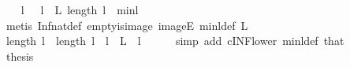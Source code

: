 \begin{isabellebody}
\ \ \isamarkupfalse%
\ l{}\ \ \ {\isachardoublequoteopen}l{}\ {\isasymin}\ L{\isachardoublequoteclose}\ {\isachardoublequoteopen}length\ l{}\ {\isacharequal}{\kern0pt}\ minl{\isachardoublequoteclose}\isanewline
\ \ \ \ \isamarkupfalse%
\ {\isacharparenleft}{\kern0pt}metis\ Inf{\isacharunderscore}{\kern0pt}nat{\isacharunderscore}{\kern0pt}def{}\ empty{\isacharunderscore}{\kern0pt}is{\isacharunderscore}{\kern0pt}image\ imageE\ minl{\isacharunderscore}{\kern0pt}def\ {\isacartoucheopen}L\ {\isasymnoteq}\ {\isacharbraceleft}{\kern0pt}{\isacharbraceright}{\kern0pt}{\isacartoucheclose}{\isacharparenright}{\kern0pt}\isanewline
\ \ \isamarkupfalse%
\ \isamarkupfalse%
\ {\isachardoublequoteopen}length\ l{}\ {\isasymle}\ length\ l{\isachardoublequoteclose}\ \ {\isachardoublequoteopen}l\ {\isasymin}\ L{\isachardoublequoteclose}\ \ l\isanewline
\ \ \ \ \isamarkupfalse%
\ {\isacharparenleft}{\kern0pt}simp\ add{\isacharcolon}{\kern0pt}\ cINF{\isacharunderscore}{\kern0pt}lower\ minl{\isacharunderscore}{\kern0pt}def\ that{\isacharparenright}{\kern0pt}\isanewline
\isanewline
\ \ \isamarkupfalse%
\ {\isacharquery}{\kern0pt}thesis\ \isanewline
\ \ \ \ \isamarkupfalse%
\isanewline
{}\isamarkupfalse%
%
\endisatagproof
{\isafoldproof}%
%
\isadelimproof
\isanewline
%
\endisadelimproof
\isanewline
\isanewline
\isanewline
%
\isadelimtheory
\isanewline
%
\endisadelimtheory
%
\isatagtheory
{}\isamarkupfalse%
%
\endisatagtheory
{\isafoldtheory}%
%
\isadelimtheory
%
\endisadelimtheory
%
\end{isabellebody}%
\endinput
